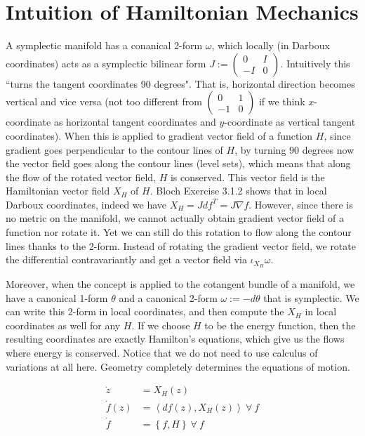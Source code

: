 \documentclass[12pt,class=article,crop=false]{standalone}
\begin{document}
\section{Intuition of Hamiltonian Mechanics}
A symplectic manifold has a conanical 2-form $ \omega$, which locally (in Darboux coordinates) acts as a symplectic bilinear form $J:= \begin{pmatrix} 0&I\\-I & 0 \end{pmatrix} $. Intuitively this ``turns the tangent coordinates 90 degrees". That is, horizontal direction becomes vertical and vice versa (not too different from $ \begin{pmatrix} 0&1\\-1&0 \end{pmatrix} $ if we think $ x$-coordinate as horizontal tangent coordinates and  $ y$-coordinate as vertical tangent coordinates). When this is applied to gradient vector field  of a function $ H$, since gradient goes perpendicular to the contour lines of $ H$, by turning 90 degrees now the vector field goes along the contour lines (level sets), which means that along the flow of the rotated vector field, $ H$ is conserved. This vector field is the Hamiltonian vector field $ X_H$ of  $ H$. Bloch Exercise 3.1.2 shows that in local Darboux coordinates, indeed we have $ X_H = J df^{T} = J \nabla f$. However, since there is no metric on the manifold, we cannot actually obtain gradient vector field of a function nor rotate it. Yet we can still do this rotation to flow along the contour lines thanks to the 2-form. Instead of rotating the gradient vector field, we rotate the differential contravariantly and get a vector field via $ \iota_{{X_H}} \omega$.

Moreover, when the concept is applied to the cotangent bundle of a manifold, we have a canonical 1-form $ \theta$ and a canonical 2-form $ \omega := -d \theta$ that is symplectic. We can write this 2-form in local coordinates, and then compute the $ X_H$ in local coordinates as well for any $ H$. If we choose $ H$ to be the energy function, then the resulting coordinates are exactly Hamilton's equations, which give us the flows where energy is conserved. Notice that we do not need to use calculus of variations at all here. Geometry completely determines the equations of motion.

\begin{align*}
	\dot{z} &= X_H(z) \\
	\dot{f}(z) &= \left\langle df(z), X_H(z) \right\rangle \ \forall \ f\\
	\dot{f} &= \left\{ f,H \right\} \ \forall \ f
\end{align*}
\end{document}
